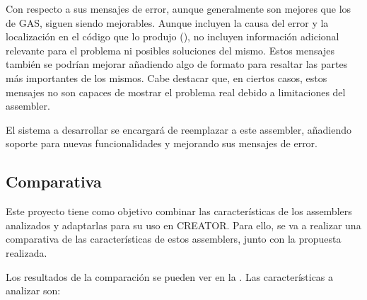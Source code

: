 Con respecto a sus mensajes de error, aunque generalmente son mejores que los de
\gls{GAS}, siguen siendo mejorables. Aunque incluyen la causa del error y la
localización en el código que lo produjo (), no
incluyen información adicional relevante para el problema ni posibles soluciones
del mismo. Estos mensajes también se podrían mejorar añadiendo algo de formato
para resaltar las partes más importantes de los mismos. Cabe destacar que, en
ciertos casos, estos mensajes no son capaces de mostrar el problema real debido
a limitaciones del \gls{assembler}.


El sistema a desarrollar se encargará de reemplazar a este \gls{assembler},
añadiendo soporte para nuevas funcionalidades y mejorando sus mensajes de error.

\subsection{Comparativa}

Este proyecto tiene como objetivo combinar las características de los
\glspl{assembler} analizados y adaptarlas para su uso en CREATOR. Para ello, se
va a realizar una comparativa de las características de estos \glspl{assembler},
junto con la propuesta realizada.

Los resultados de la comparación se pueden ver en la
. Las características a analizar son:

